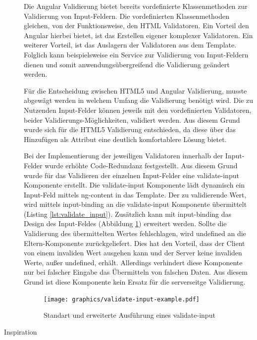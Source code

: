\begin{description}
	Die Angular Validierung bietet bereits vordefinierte Klassenmethoden zur Validierung von Input-Feldern. Die vordefinierten Klassenmethoden gleichen, von der Funktionsweise, den HTML Validatoren. Ein Vorteil den Angular hierbei bietet, ist das Erstellen eigener komplexer Validatoren. Ein weiterer Vorteil, ist das Auslagern der Validatoren aus dem Template. Folglich kann beispielsweise ein Service zur Validierung von Input-Feldern dienen und somit anwendungsübergreifend die Validierung geändert werden.

	Für die Entscheidung zwischen \gls{HTML}5 und Angular Validierung, musste abgewägt werden in welchem Umfang die Validierung benötigt wird. Die zu Nutzenden Input-Felder können jeweils mit den vordefinierten Validatoren, beider Validierungs-Möglichkeiten, validiert werden. Aus diesem Grund wurde sich für die \gls{HTML}5 Validierung entschieden, da diese über das Hinzufügen als Attribut eine deutlich komfortablere Lösung bietet.

	Bei der Implementierung der jeweiligen Validatoren innerhalb der Input-Felder wurde erhöhte Code-Redundanz festgestellt. Aus diesem Grund wurde für das Validieren der einzelnen Input-Felder eine validate-input Komponente erstellt. Die validate-input Komponente lädt dynamisch ein Input-Feld mittels ng-content in das Template. Der zu validierende Wert, wird mittels input-binding an die validate-input Komponente übermittelt (Listing \ref{lst:validate_input}). Zusätzlich kann mit input-binding das Design des Input-Feldes (Abbildung \ref{fig:validate_input}) erweitert werden. Sollte die Validierung des übermittelten Wertes fehlschlagen, wird undefined an die Eltern-Komponente zurückgeliefert. Dies hat den Vorteil, dass der Client von einem invaliden Wert ausgehen kann und der Server keine invaliden Werte, außer undefined, erhält. Allerdings verhindert diese Komponente nur bei falscher Eingabe das Übermitteln von falschen Daten. Aus diesem Grund ist diese Komponente kein Ersatz für die serverseitge Validierung.

	\begin{figure}
		\centering
		\texttt{[image: graphics/validate-input-example.pdf]}
		\caption{Standart und erweiterte Ausführung eines validate-input}
		\label{fig:validate_input}
	\end{figure}


	\begin{minipage}{\linewidth}
			
	\end{minipage}

	\item[Inspiration]\hfill\\
\end{description}

